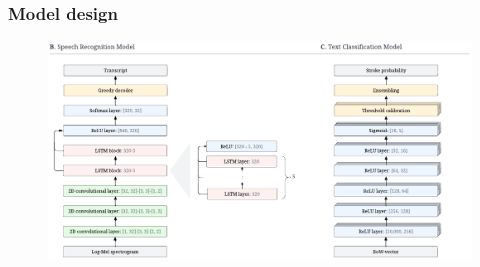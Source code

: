 \begin{frame}
    \frametitle{Model design}
    \begin{figure}
        \centering
        \includegraphics[width=0.70\paperwidth]{../graphics/paper_retrospective/model_sketch-bottom-part.pdf}
    \end{figure}
\end{frame}


\newcommand{\shade}[1]{{\color{black!40}#1}}

